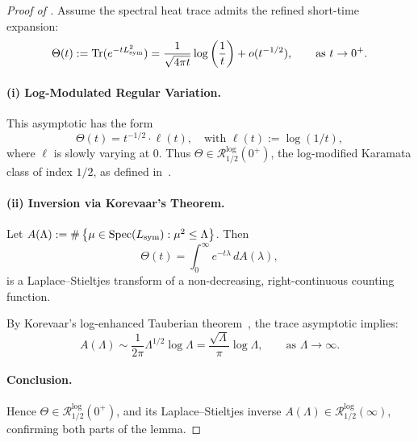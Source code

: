 \begin{proof}[Proof of ]
Assume the spectral heat trace admits the refined short-time expansion:
\[
\Theta(t) := \operatorname{Tr}(e^{-t L_{\mathrm{sym}}^2}) = \frac{1}{\sqrt{4\pi t}} \log\left( \frac{1}{t} \right) + o(t^{-1/2}), \qquad \text{as } t \to 0^+.
\]

\paragraph{(i) Log-Modulated Regular Variation.}
This asymptotic has the form
\[
\Theta(t) = t^{-1/2} \cdot \ell(t), \quad \text{with } \ell(t) := \log(1/t),
\]
where \( \ell \) is slowly varying at 0. Thus \( \Theta \in \mathcal{R}_{1/2}^{\log}(0^+) \), the log-modified Karamata class of index \( 1/2 \), as defined in~\cite[Ch.~III, §5]{Korevaar2004Tauberian}.

\paragraph{(ii) Inversion via Korevaar's Theorem.}
Let \( A(\Lambda) := \#\left\{ \mu \in \operatorname{Spec}(L_{\mathrm{sym}}) : \mu^2 \le \Lambda \right\} \). Then
\[
\Theta(t) = \int_0^\infty e^{-t \lambda} \, dA(\lambda),
\]
is a Laplace–Stieltjes transform of a non-decreasing, right-continuous counting function.

By Korevaar’s log-enhanced Tauberian theorem~\cite[Ch.~III, Thm.~5.5]{Korevaar2004Tauberian}, the trace asymptotic implies:
\[
A(\Lambda) \sim \frac{1}{2\pi} \Lambda^{1/2} \log \Lambda = \frac{\sqrt{\Lambda}}{\pi} \log \Lambda, \qquad \text{as } \Lambda \to \infty.
\]

\paragraph{Conclusion.}
Hence \( \Theta \in \mathcal{R}_{1/2}^{\log}(0^+) \), and its Laplace–Stieltjes inverse \( A(\Lambda) \in \mathcal{R}_{1/2}^{\log}(\infty) \), confirming both parts of the lemma.
\end{proof}
